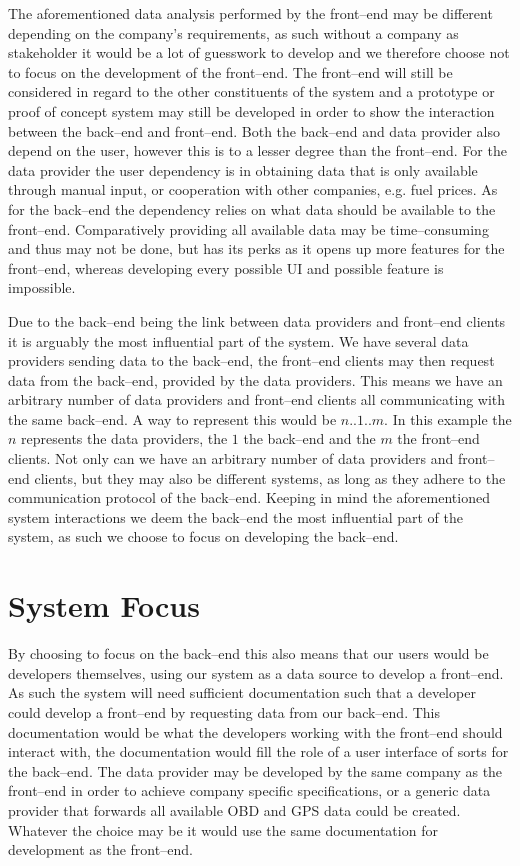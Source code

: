 The aforementioned data analysis performed by the front--end may be different depending on the company's requirements, as such without a company as stakeholder it would be a lot of guesswork to develop and we therefore choose not to focus on the development of the front--end.
The front--end will still be considered in regard to the other constituents of the system and a prototype or proof of concept system may still be developed in order to show the interaction between the back--end and front--end.
Both the back--end and data provider also depend on the user, however this is to a lesser degree than the front--end.
For the data provider the user dependency is in obtaining data that is only available through manual input, or cooperation with other companies, e.g. fuel prices.
As for the back--end the dependency relies on what data should be available to the front--end.
Comparatively providing all available data may be time--consuming and thus may not be done, but has its perks as it opens up more features for the front--end, whereas developing every possible UI and possible feature is impossible.

\bigskip
Due to the back--end being the link between data providers and front--end clients it is arguably the most influential part of the system.
We have several data providers sending data to the back--end, the front--end clients may then request data from the back--end, provided by the data providers.
This means we have an arbitrary number of data providers and front--end clients all communicating with the same back--end.
A way to represent this would be $n..1..m$.
In this example the $n$ represents the data providers, the $1$ the back--end and the $m$ the front--end clients.
Not only can we have an arbitrary number of data providers and front--end clients, but they may also be different systems, as long as they adhere to the communication protocol of the back--end.
Keeping in mind the aforementioned system interactions we deem the back--end the most influential part of the system, as such we choose to focus on developing the back--end.

\section{System Focus}
By choosing to focus on the back--end this also means that our users would be developers themselves, using our system as a data source to develop a front--end.
As such the system will need sufficient documentation such that a developer could develop a front--end by requesting data from our back--end.
This documentation would be what the developers working with the front--end should interact with, the documentation would fill the role of a user interface of sorts for the back--end.
The data provider may be developed by the same company as the front--end in order to achieve company specific specifications, or a generic data provider that forwards all available \ac{OBD} and GPS data could be created.
Whatever the choice may be it would use the same documentation for development as the front--end.

